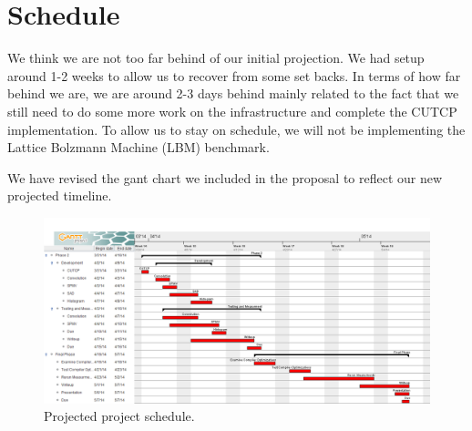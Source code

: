 
\section*{Schedule}

We think we are not too far behind of our initial 
  projection.
We had setup around 1-2 weeks to allow us to recover 
  from some set backs.
In terms of how far behind we are, we are around 2-3
  days behind mainly related to the fact that we 
  still need to do some more work on the infrastructure
  and complete the CUTCP implementation.
To allow us to stay on schedule, we will not be implementing
  the Lattice Bolzmann Machine (LBM) benchmark. 

We have revised the gant chart we included in the proposal
  to reflect our new projected timeline.

\begin{figure}[t!]
\includegraphics[scale=0.4, angle=90]{chart.png}
\caption{Projected project schedule.}
\label{fig:schedule}
\centering
\end{figure}
